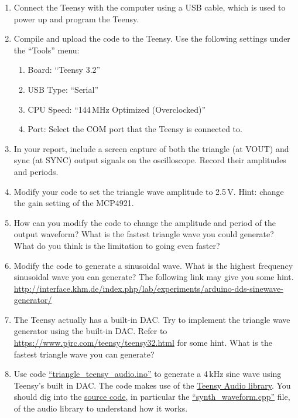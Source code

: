 \documentclass[letterpaper, 11pt]{article}
\begin{document}
\begin{enumerate}
\item Connect the Teensy with the computer using a USB cable, which is used to power up and program the Teensy.

\item Compile and upload the code to the Teensy. Use the following settings under the ``Tools'' menu: 
	\begin{enumerate}
		\item Board: ``Teensy 3.2''
		\item USB Type: ``Serial''
		\item CPU Speed: ``144\,MHz Optimized (Overclocked)''
		\item Port: Select the COM port that the Teensy is connected to. 
	\end{enumerate}

\item In your report, include a screen capture of both the triangle (at VOUT) and sync (at SYNC) output signals on the oscilloscope. Record their amplitudes and periods.

\item Modify your code to set the triangle wave amplitude to 2.5\,V. Hint: change the gain setting of the MCP4921. 

\item How can you modify the code to change the amplitude and period of the output waveform? What is the fastest triangle wave you could generate? What do you think is the limitation to going even faster?

\item Modify the code to generate a sinusoidal wave. What is the highest frequency sinusoidal wave you can generate? The following link may give you some hint. 
\url{http://interface.khm.de/index.php/lab/experiments/arduino-dds-sinewave-generator/} 


\item The Teensy actually has a built-in DAC. Try to implement the triangle wave generator using the built-in DAC. Refer to \url{https://www.pjrc.com/teensy/teensy32.html} for some hint. What is the fastest triangle wave you can generate?

\item Use code \href{https://github.com/ucdart/UCD-EEC134/blob/master/labs/lab1/code/triangle_teensy_audio/triangle_teensy_audio.ino}{``triangle\_teensy\_audio.ino''} to generate a 4\,kHz sine wave using Teensy's built in DAC. The code makes use of the \href{http://www.pjrc.com/teensy/td_libs_Audio.html}{Teensy Audio library}. You should dig into the \href{https://github.com/PaulStoffregen/Audio}{source code}, in particular the \href{https://github.com/PaulStoffregen/Audio/blob/master/synth_waveform.cpp}{``synth\_waveform.cpp''} file, of the audio library to understand how it works. 
\end{enumerate}
\end{document}
